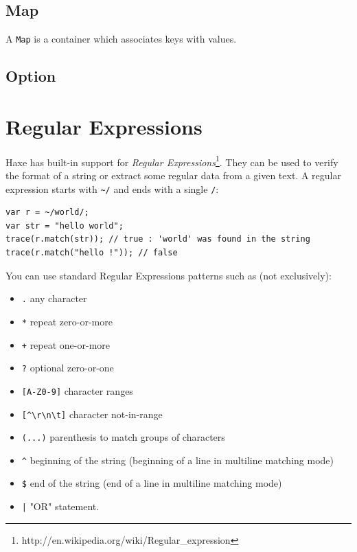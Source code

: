 \documentclass[a4paper,oneside]{book}
\newcommand{\type}[1]{\texttt{#1}}
\newcommand{\expr}[1]{\texttt{#1}}
\begin{document}
\subsection{Map}
\label{std-Map}

A \type{Map} is a container which associates keys with values. 

\subsection{Option}
\label{std-Option}

\section{Regular Expressions}
\label{std-regex}

Haxe has built-in support for \emph{Regular Expressions}\footnote{http://en.wikipedia.org/wiki/Regular_expression}. They can be used to verify the format of a string or extract some regular data from a given text. A regular expression starts with \expr{\textasciitilde/} and ends with a single \expr{/}:

\begin{lstlisting}
var r = ~/world/;
var str = "hello world";
trace(r.match(str)); // true : 'world' was found in the string
trace(r.match("hello !")); // false
\end{lstlisting}

\bigskip

You can use standard Regular Expressions patterns such as (not exclusively):
\begin{itemize}
    \item \expr{.} any character
    \item \expr{*} repeat zero-or-more
    \item \expr{+} repeat one-or-more
    \item \expr{?} optional zero-or-one
    \item \expr{[A-Z0-9]} character ranges
    \item \expr{[\textasciicircum\textbackslash r\textbackslash n\textbackslash t]} character not-in-range
    \item \expr{(...)} parenthesis to match groups of characters
    \item \expr{\textasciicircum} beginning of the string (beginning of a line in multiline matching mode)
    \item \expr{\$} end of the string (end of a line in multiline matching mode)
    \item \expr{|} "OR" statement.
\end{itemize}
\end{document}
